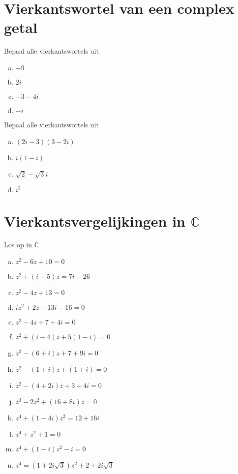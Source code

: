 \documentclass[12pt,twoside]{article}
\begin{document}
\pagebreak
\section{Vierkantswortel van een complex getal}

\begin{oefening}
  Bepaal alle vierkantswortels uit
  \begin{enumerate}[(a)]
    \itemsep 1em
  \item $-9$
  \item $2i$
  \item $-3-4i$
  \item $-i$
  \end{enumerate}
\end{oefening}

\begin{oefening}
  Bepaal alle vierkantswortels uit
  \begin{enumerate}[(a)]
    \itemsep 1em
  \item $(2i-3)(3-2i)$
  \item $i(1-i)$
  \item $\sqrt{2}-\sqrt{3}i$
  \item $i^5$
  \end{enumerate}
\end{oefening}

\pagebreak
\section{Vierkantsvergelijkingen in $\mathbb{C}$}

\begin{oefening}
  Los op in $\mathbb{C}$
  \begin{enumerate}[(a)]
    \itemsep 1em
  \item $z^2-6z+10=0$
  \item $z^2+(i-5)z=7i-26$
  \item $z^2-4z+13=0$
  \item $iz^2+2z-13i-16=0$
  \item $z^2-4z+7+4i=0$
  \item $z^2+(i-4)z+5(1-i)=0$
  \item $z^2-(6+i)z+7+9i=0$
  \item $z^2-(1+i)z+(1+i)=0$
  \item $z^2-(4+2i)z+3+4i=0$
  \item $z^3-2z^2+(16+8i)z=0$
  \item $z^4+(1-4i)z^2=12+16i$
  \item $z^4+z^2+1=0$
  \item $z^4+(1-i)z^2-i=0$
  \item $z^4=(1+2i\sqrt{3})z^2+2+2i\sqrt{3}$
  \end{enumerate}
\end{oefening}
\end{document}
